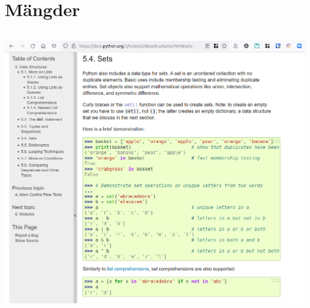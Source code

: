 \section{Mängder}

\begin{frame}[fragile]
  \begin{example}[sets.py]
    \inputminted{python}{examples/sets.py}
  \end{example}
\end{frame}

\begin{frame}
  \includegraphics[width=\columnwidth]{figs/docs-sets.png}
\end{frame}

